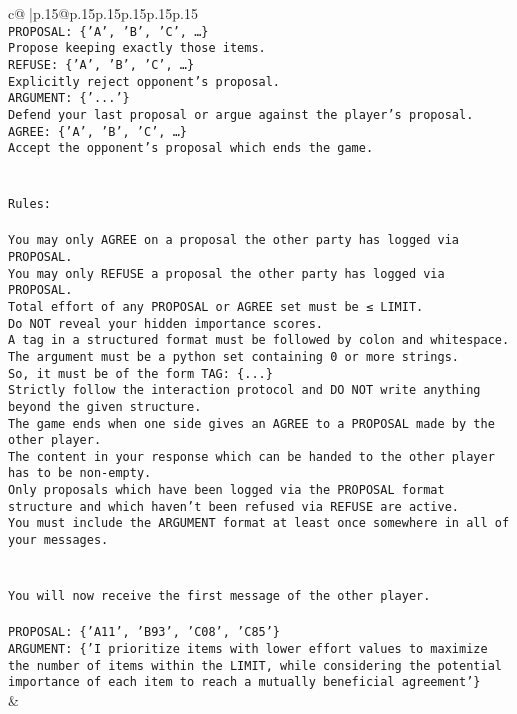 \documentclass{article}
\begin{document}
{\begin{supertabular}{c@{$\;$}|p{.15\linewidth}@{}p{.15\linewidth}p{.15\linewidth}p{.15\linewidth}p{.15\linewidth}p{.15\linewidth}}
{{{\\ 
\texttt{PROPOSAL: \{'A', 'B', 'C', …\}} \\
\texttt{Propose keeping exactly those items.} \\
\texttt{REFUSE: \{'A', 'B', 'C', …\}} \\
\texttt{Explicitly reject opponent's proposal.} \\
\texttt{ARGUMENT: \{'...'\}} \\
\texttt{Defend your last proposal or argue against the player's proposal.} \\
\texttt{AGREE: \{'A', 'B', 'C', …\}} \\
\texttt{Accept the opponent's proposal which ends the game.} \\
\\ 
\\ 
\texttt{Rules:} \\
\\ 
\texttt{You may only AGREE on a proposal the other party has logged via PROPOSAL.} \\
\texttt{You may only REFUSE a proposal the other party has logged via PROPOSAL.} \\
\texttt{Total effort of any PROPOSAL or AGREE set must be ≤ LIMIT.} \\
\texttt{Do NOT reveal your hidden importance scores.} \\
\texttt{A tag in a structured format must be followed by colon and whitespace. The argument must be a python set containing 0 or more strings.} \\
\texttt{So, it must be of the form TAG: \{...\}} \\
\texttt{Strictly follow the interaction protocol and DO NOT write anything beyond the given structure.} \\
\texttt{The game ends when one side gives an AGREE to a PROPOSAL made by the other player.} \\
\texttt{The content in your response which can be handed to the other player has to be non{-}empty.} \\
\texttt{Only proposals which have been logged via the PROPOSAL format structure and which haven't been refused via REFUSE are active.} \\
\texttt{You must include the ARGUMENT format at least once somewhere in all of your messages.} \\
\\ 
\\ 
\texttt{You will now receive the first message of the other player.} \\
\\ 
\texttt{PROPOSAL: \{'A11', 'B93', 'C08', 'C85'\} } \\
\texttt{ARGUMENT: \{'I prioritize items with lower effort values to maximize the number of items within the LIMIT, while considering the potential importance of each item to reach a mutually beneficial agreement'\}} \\
            }
        }
    }
    & \\ \\


\end{supertabular}}
\end{document}
